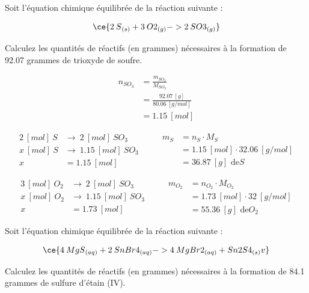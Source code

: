 \documentclass[
  11pt,
  a4paper,
  openany]{book}
\begin{document}
\newpage

\begin{Exercise}

Soit l'équation chimique équilibrée de la réaction suivante :

\[ \ce{ 2\:S{}_{(s)} + 3\:O2{}_{(g)} -> 2\:SO3{}_{(g)} } \]

Calculez les quantités de réactifs (en grammes) nécessaires à la formation de 92.07 grammes de trioxyde de soufre.


\end{Exercise}

\begin{Answer}
\[ \begin{split}
    n_{SO_{3}} &= \frac{m_{SO_{3}}}{M_{SO_{3}}} \\
    &= \frac{92.07\ [g]}{80.06\ [g/mol]} \\
    &= 1.15\ [mol]
    \end{split} \]

\[ \begin{split}
  2\ [mol]\ S &\rightarrow\ 2\ [mol]\ SO_{3} \\
  x\ [mol]\ S &\rightarrow\ 1.15\ [mol]\ SO_{3} \\
  x &= 1.15\ [mol]
  \end{split}
    \qquad
    \begin{split}
    m_{S} &= n_{S} \cdot M_{S} \\
  &= 1.15\ [mol] \cdot 32.06\ [g/mol] \\
  &= 36.87\ [g] \text{ de} S
  \end{split} \]

\[ \begin{split}
    3\ [mol]\ O_2 &\rightarrow\ 2\ [mol]\ SO_{3} \\
    x\ [mol]\ O_2 &\rightarrow\ 1.15\ [mol]\ SO_{3} \\
    x &= 1.73\ [mol]
    \end{split}
    \qquad
    \begin{split}
    m_{O_{2}} &= n_{O_{2}} \cdot M_{O_{2}} \\
    &= 1.73\ [mol] \cdot 32\ [g/mol] \\
    &= 55.36\ [g] \text{ de} O_{2}
  \end{split} \]

\end{Answer}

\begin{Exercise}

Soit l'équation chimique équilibrée de la réaction suivante :

\[ \ce{ 4\:MgS{}_{(aq)} + 2\:SnBr4{}_{(aq)} -> 4\:MgBr2{}_{(aq)} + Sn2S4{}_{(s)} v } \]

Calculez les quantités de réactifs (en grammes) nécessaires à la formation de 84.1 grammes de sulfure d'étain (IV).


\end{Exercise}
\end{document}
